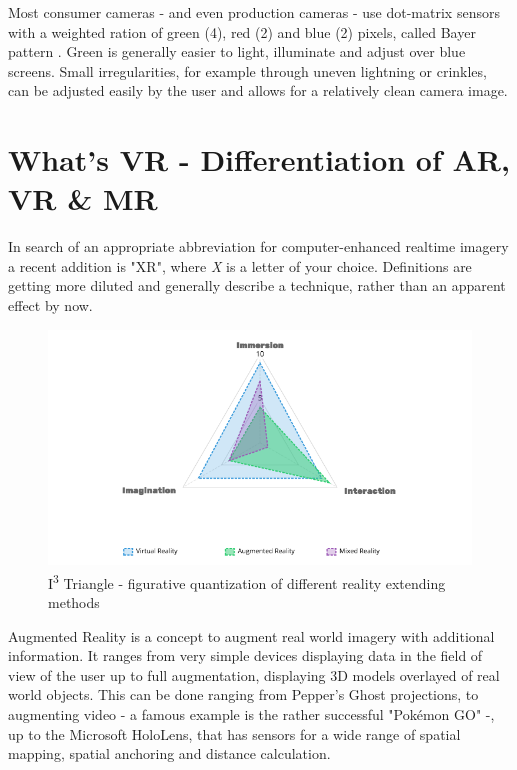 
Most consumer cameras - and even production cameras - use dot-matrix sensors 
with a weighted ration of green (4), red (2) and blue (2) pixels, called Bayer 
pattern \cite{kodak:bayer:1976}. Green is generally easier to light, illuminate 
and adjust over blue 
screens. Small irregularities, for example through uneven lightning or 
crinkles, can be adjusted easily by the user and allows for a 
relatively clean camera image.

\section{What's VR - Differentiation of AR, VR \& MR}

In search of an appropriate abbreviation for computer-enhanced realtime imagery 
a recent addition is "XR", where \textit{X} is a letter of your choice. 
Definitions are getting more diluted and generally describe a technique, rather 
than an apparent effect by now.

\begin{figure}[htb]
	\includegraphics[width=\textwidth]{_raw_resources/i3-triangle.png}
	\caption{I\textsuperscript{3} Triangle - figurative quantization of 
		different reality extending methods}
	\label{fig:xr:i3-triangle}
\end{figure}
Augmented Reality is a concept to augment real world imagery with additional 
information. It ranges from very simple devices displaying data in the field of 
view of the user up to full augmentation, displaying 3D models overlayed of 
real world objects. This can be done ranging from Pepper's Ghost projections, 
to augmenting video - a famous example is the rather successful "Pokémon GO" -, 
up to the Microsoft HoloLens, that has sensors for a wide range of spatial 
mapping, spatial anchoring and distance calculation.

